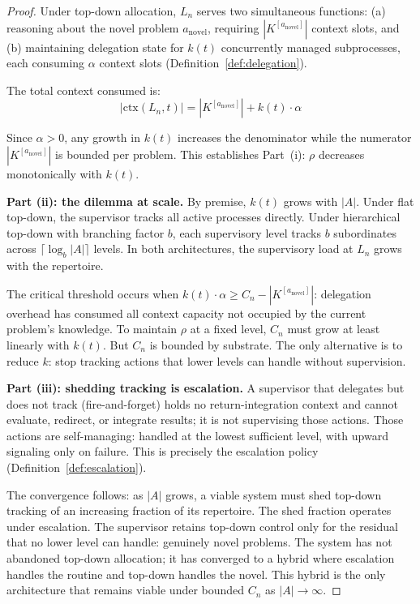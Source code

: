 \documentclass[11pt]{article}
\theoremstyle{definition}
\begin{document}
\begin{proof}
Under top-down allocation, $L_n$ serves two simultaneous functions:
(a) reasoning about the novel problem $a_{\mathrm{novel}}$, requiring
$|K^{[a_{\mathrm{novel}}]}|$ context slots, and (b) maintaining
delegation state for $k(t)$ concurrently managed subprocesses, each
consuming $\alpha$ context slots (Definition~\ref{def:delegation}).

The total context consumed is:
\[
|\mathrm{ctx}(L_n, t)| = |K^{[a_{\mathrm{novel}}]}| + k(t) \cdot \alpha
\]

Since $\alpha > 0$, any growth in $k(t)$ increases the denominator
while the numerator $|K^{[a_{\mathrm{novel}}]}|$ is bounded per
problem. This establishes Part~(i): $\rho$ decreases monotonically
with $k(t)$.

\textbf{Part (ii): the dilemma at scale.} By premise, $k(t)$ grows
with $|A|$. Under flat top-down, the supervisor tracks all active
processes directly. Under hierarchical top-down with branching factor
$b$, each supervisory level tracks $b$ subordinates across
$\lceil \log_b |A| \rceil$ levels. In both architectures, the
supervisory load at $L_n$ grows with the repertoire.

The critical threshold occurs when $k(t) \cdot \alpha \geq C_n -
|K^{[a_{\mathrm{novel}}]}|$: delegation overhead has consumed all
context capacity not occupied by the current problem's knowledge. To
maintain $\rho$ at a fixed level, $C_n$ must grow at least linearly
with $k(t)$. But $C_n$ is bounded by substrate. The only alternative
is to reduce $k$: stop tracking actions that lower levels can
handle without supervision.

\textbf{Part (iii): shedding tracking is escalation.} A supervisor
that delegates but does not track (fire-and-forget) holds no
return-integration context and cannot evaluate, redirect, or integrate
results; it is not supervising those actions. Those actions are
self-managing: handled at the lowest sufficient level, with upward
signaling only on failure. This is precisely the escalation policy
(Definition~\ref{def:escalation}).

The convergence follows: as $|A|$ grows, a viable system must shed
top-down tracking of an increasing fraction of its repertoire. The
shed fraction operates under escalation. The supervisor retains
top-down control only for the residual that no lower level can
handle: genuinely novel problems. The system has not abandoned
top-down allocation; it has converged to a hybrid where escalation
handles the routine and top-down handles the novel. This hybrid is
the only architecture that remains viable under bounded $C_n$ as
$|A| \to \infty$.
\end{proof}
\end{document}
